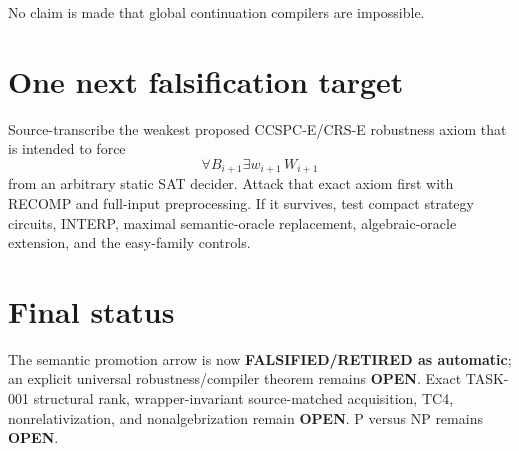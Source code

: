 \documentclass[11pt]{article}
\begin{document}
No claim is made that global continuation compilers are impossible.

\section*{One next falsification target}
Source-transcribe the weakest proposed CCSPC-E/CRS-E robustness axiom that is intended to force
\[
\forall B_{i+1}\exists w_{i+1}\,W_{i+1}
\]
from an arbitrary static SAT decider. Attack that exact axiom first with RECOMP and full-input preprocessing. If it survives, test compact strategy circuits, INTERP, maximal semantic-oracle replacement, algebraic-oracle extension, and the easy-family controls.

\section*{Final status}
The semantic promotion arrow is now \textbf{FALSIFIED/RETIRED as automatic}; an explicit universal robustness/compiler theorem remains \textbf{OPEN}. Exact TASK-001 structural rank, wrapper-invariant source-matched acquisition, TC4, nonrelativization, and nonalgebrization remain \textbf{OPEN}. P versus NP remains \textbf{OPEN}.

\end{document}
